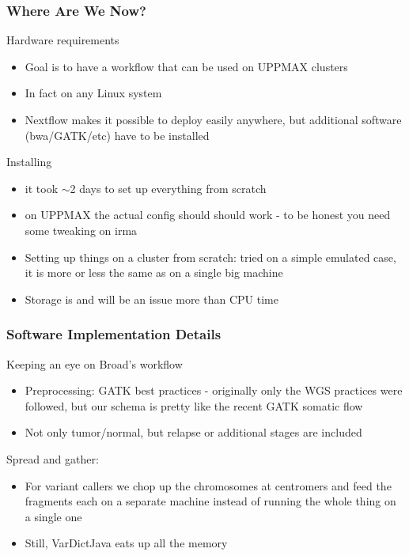 \documentclass{beamer}
\begin{document}
\begin{frame}
\frametitle{Where Are We Now?}
\begin{block}{Hardware requirements}
	\begin{itemize}
		\item Goal is to have a workflow that can be used on UPPMAX clusters
		\item In fact on any Linux system
		\item Nextflow makes it possible to deploy easily anywhere, but additional software (bwa/GATK/etc) have to be installed
	\end{itemize}
\end{block}
\begin{block}{Installing}
	\begin{itemize}
		\item it took $\sim$2 days to set up everything from scratch
		\item on UPPMAX the actual config should should work - to be honest you need some tweaking on irma
		\item Setting up things on a cluster from scratch: tried on a simple emulated case, it is more or less the same as on a single big machine
		\item \alert{Storage is and will be an issue more than CPU time}
	\end{itemize}
\end{block}
\end{frame}

\begin{frame}
\frametitle{Software Implementation Details}
\begin{block}{Keeping an eye on Broad's workflow}
	\begin{itemize}
		\item Preprocessing: GATK best practices - originally only the WGS practices were followed, but our schema is pretty like the recent GATK somatic flow
		\item Not only tumor/normal, but relapse or additional stages are included
	\end{itemize}
\end{block}
\begin{block}{Spread and gather:}
	\begin{itemize}
		\item For variant callers we chop up the chromosomes at centromers and feed the fragments each on a separate machine instead of running the whole thing on a single one 
		\item Still, VarDictJava eats up all the memory
	\end{itemize}
\end{block}
\end{frame}
\end{document}
